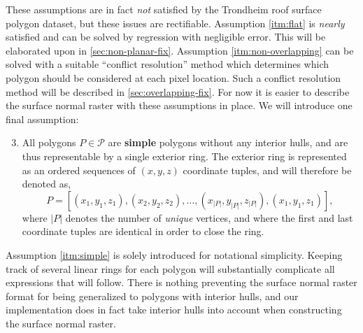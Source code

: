 These assumptions are in fact \emph{not} satisfied by the Trondheim roof surface polygon dataset, but these issues are rectifiable.
Assumption \ref{itm:flat} is \textit{nearly} satisfied and can be solved by regression with negligible error.
This will be elaborated upon in \cref{sec:non-planar-fix}.
Assumption \ref{itm:non-overlapping} can be solved with a suitable \enquote{conflict resolution} method which determines which polygon should be considered at each pixel location.
Such a conflict resolution method will be described in \cref{sec:overlapping-fix}.
For now it is easier to describe the surface normal raster with these assumptions in place.
We will introduce one final assumption:
\begin{enumerate}[label=\bfseries\sffamily A\arabic*, ref=A\arabic*]
  \setcounter{enumi}{2}
  \item \label{itm:simple} All polygons $P \in \mathcal{P}$ are \textbf{simple} polygons without any interior hulls, and are thus representable by a single exterior ring.
   The exterior ring is represented as an ordered sequences of $(x, y, z)$ coordinate tuples, and will therefore be denoted as,
    \begin{equation*}
      P = [(x_1, y_1, z_1), (x_2, y_2, z_2), \dots, (x_{|P|}, y_{|P|}, z_{|P|}), (x_1, y_1, z_1)],
    \end{equation*}
    where $|P|$ denotes the number of \emph{unique} vertices, and where the first and last coordinate tuples are identical in order to close the ring.
\end{enumerate}
Assumption \ref{itm:simple} is solely introduced for notational simplicity.
Keeping track of several linear rings for each polygon will substantially complicate all expressions that will follow.
There is nothing preventing the surface normal raster format for being generalized to polygons with interior hulls, and our implementation does in fact take interior hulls into account when constructing the surface normal raster.

